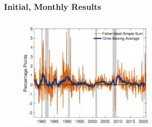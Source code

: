 \documentclass[11pt, handout, aspectratio=169]{beamer}
\begin{document}
\begin{frame}
\frametitle{Initial, Monthly Results}
\label{slide:InitialResult}
\begin{columns}[b]
	\begin{column}{0.95\textwidth}
		\begin{figure}
			\centering
			\includegraphics[width=0.63\textwidth]{../Figures/GrowthDiff_v2.eps}
		\end{figure}
	\end{column}
	\begin{column}{0.05\textwidth}
		\vfill
		\hfill \hyperlink{slide:BaselineResult}{}
	\end{column}
\end{columns}
\end{frame}
\end{document}
